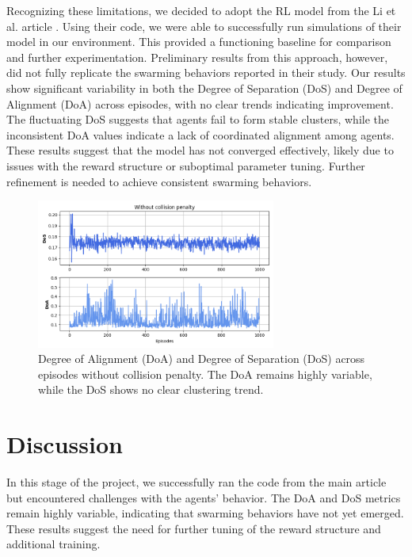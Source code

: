 \documentclass[9pt]{pnas-new}
\begin{document}
Recognizing these limitations, we decided to adopt the RL model from the Li et al. article \cite{li2023predator}.
Using their code, we were able to successfully run simulations of their model in our environment. 
This provided a functioning baseline for comparison and further experimentation.
Preliminary results from this approach, however, did not fully replicate the swarming behaviors reported in their study.
Our results show significant variability in both the Degree of Separation (DoS) and Degree of Alignment (DoA) across episodes, with no clear trends indicating improvement. 
The fluctuating DoS suggests that agents fail to form stable clusters, while the inconsistent DoA values indicate a lack of coordinated alignment among agents. 
These results suggest that the model has not converged effectively, likely due to issues with the reward structure or suboptimal parameter tuning. 
Further refinement is needed to achieve consistent swarming behaviors.

\begin{figure}[htbp]
    \centering
    \includegraphics[width=0.7\textwidth]{fig/Without_collision.png}
    \caption{Degree of Alignment (DoA) and Degree of Separation (DoS) across episodes without collision penalty. The DoA remains highly variable, while the DoS shows no clear clustering trend.}
    \label{fig:doa_dos_without_collision}
\end{figure}


\section*{Discussion}
In this stage of the project, we successfully ran the code from the main article but encountered challenges with the agents' behavior. 
The DoA and DoS metrics remain highly variable, indicating that swarming behaviors have not yet emerged. 
These results suggest the need for further tuning of the reward structure and additional training.
\end{document}
